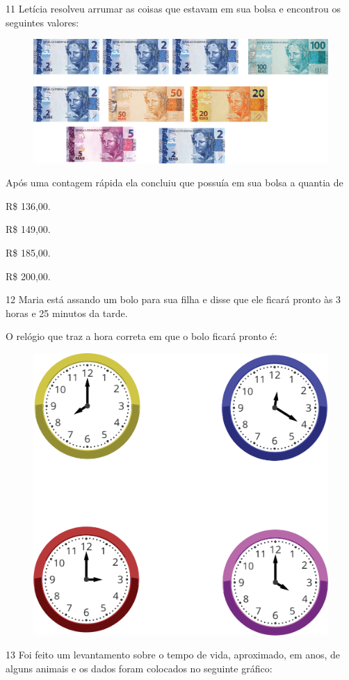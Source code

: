 \num{11} Letícia resolveu arrumar as coisas que estavam em sua bolsa e encontrou os seguintes valores:

\begin{figure}[htpb!]
\centering
\includegraphics[width=\textwidth]{./media/image110.png}
\end{figure}

Após uma contagem rápida ela concluiu que possuía em sua bolsa a quantia de

\begin{escolha}
\item
  R\$ 136,00.
\item
  R\$ 149,00.
\item
  R\$ 185,00.
\item
  R\$ 200,00.
\end{escolha}

\pagebreak
\num{12} Maria está assando um bolo para sua filha e disse que ele ficará pronto às 3 horas e 25 minutos da tarde.

O relógio que traz a hora correta em que o bolo ficará pronto é:

\begin{figure}[htpb!]
\centering
\includegraphics[width=.45\textwidth]{./media/image111.png}
\end{figure}



\num{13} Foi feito um levantamento sobre o tempo de vida, aproximado, em anos, de alguns animais e os dados foram colocados no seguinte gráfico:

